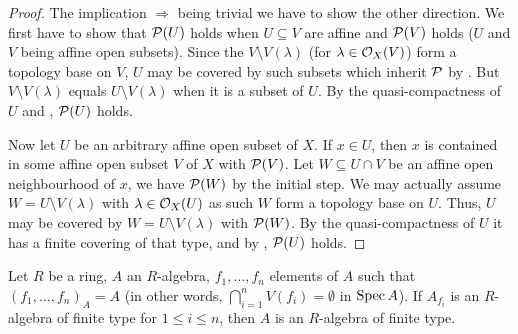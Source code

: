 \documentclass[a4paper,parskip=half,numbers=enddot, DIV=12]{scrreprt}
\begin{document}
\begin{proof}
    The implication \itememph{\beta} $\Rightarrow$ \itememph{\alpha} being trivial we have to show the other direction. We first have to show that $\mathcal{P}(U)$ holds when $U\subseteq V$ are affine and $\mathcal{P}(V)$ holds ($U$ and $V$ being affine open subsets). Since the $V\setminus V(\lambda)$ (for $\lambda\in \mathcal{O}_X(V)$) form a topology base on $V$, $U$ may be covered by such subsets which inherit $\mathcal{P}$ by . But $V\setminus V(\lambda)$ equals $U\setminus V(\lambda)$ when it is a subset of $U$. By the quasi-compactness of $U$ and , $\mathcal{P}(U)$ holds. 
    
    Now let $U$ be an arbitrary affine open subset of $X$. If $x\in U$, then $x$ is contained in some affine open subset $V$ of $X$ with $\mathcal{P}(V)$. Let $W\subseteq U\cap V$ be an affine open neighbourhood of $x$, we have $\mathcal{P}(W)$ by the initial step. We may actually assume $W=U\setminus V(\lambda)$ with $\lambda\in \mathcal{O}_X(U)$ as such $W$ form a topology base on $U$. Thus, $U$ may be covered by $W=U\setminus V(\lambda)$ with $\mathcal{P}(W)$. By the quasi-compactness of $U$ it has a finite covering of that type, and by , $\mathcal{P}(U)$ holds.
\end{proof}
\begin{lem}
    Let $R$ be a ring, $A$ an $R$-algebra, $f_1,\ldots,f_n$ elements of $A$ such that $(f_1,\ldots, f_n)_A = A$ (in other words, $\bigcap_{i=1}^n V(f_i) =\emptyset$ in $\operatorname{Spec} A$). If $A_{f_i}$ is an $R$-algebra of finite type for $1\leq i\leq n$, then $A$ is an $R$-algebra of finite type.
\end{lem}
\end{document}
